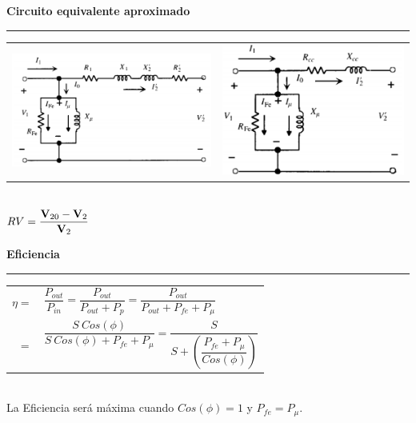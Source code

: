 \documentclass[11pt,a4paper]{article}
\newcommand{\fasor}[1]{\uppercase{\textbf{#1}}}
\newcommand{\subtitulo}[1]{
    \textbf{#1} \\ \vspace{.1cm} {\color{gray} \hrule}
}
\begin{document}
    \begin{cajita}
        \begin{center}
            \subtitulo{Circuito equivalente aproximado  }
            \begin{tabular}{c c}
                \includegraphics[width=6 cm,height=3.5 cm]{equi-aprox-1}& \includegraphics[width=6 cm,height=3.5 cm]{equi-aprox-2}
            \end{tabular}\\
            $RV=\dfrac{\fasor{V}_{20}-\fasor{V}_{2}}{\fasor{V}_{2}}$\\
            \vspace*{0.25cm}
            \subtitulo{Eficiencia}
            \vspace*{0.25cm}
            \begin{tabular}{r l}
                $\eta =$&$ \dfrac{P_{out}}{P_{in}}=\dfrac{P_{out}}{P_{out}+P_{p}}=\dfrac{P_{out}}{P_{out}+P_{fe}+P_{\mu}}$ \\[0.5 cm]
                $=$&$\dfrac{S~Cos(\phi)}{S~Cos(\phi )+P_{fe}+P_{\mu}}=
                \dfrac{S}{S+\left(\dfrac{P_{fe}+P_{\mu}}{Cos(\phi)}\right)}$\\[0.8 cm]
            \end{tabular}\\
            La Eficiencia será máxima cuando $Cos(\phi)=1$ y $ P_{fe}=P_{\mu }$.
        \end{center}


    \end{cajita}
\end{document}
